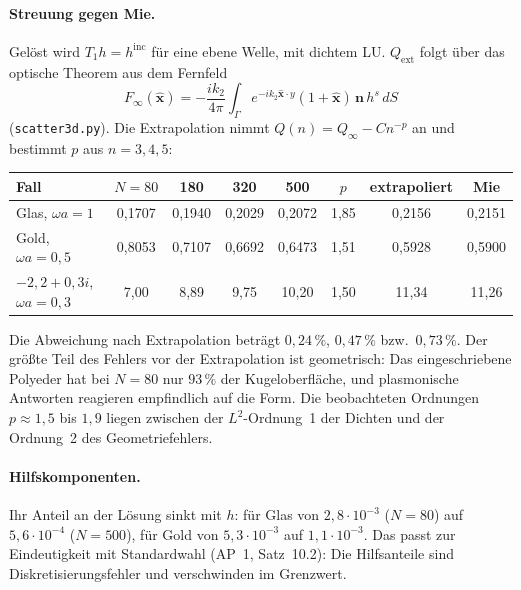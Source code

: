 \documentclass[11pt, a4paper]{article}
\newcommand{\mvec}[1]{\boldsymbol{#1}}
\newcommand{\n}{\mvec{n}}
\begin{document}
\paragraph{Streuung gegen Mie.} Gelöst wird $T_1h=h^{\mathrm{inc}}$ für eine ebene Welle,
mit dichtem LU. $Q_{\mathrm{ext}}$ folgt über das optische Theorem aus dem Fernfeld
\[
  F_\infty(\hat{\mvec x}) = -\frac{ik_2}{4\pi}\int_\Gamma e^{-ik_2\hat{\mvec x}\cdot y}(1+\hat{\mvec x})\,\n\,h^s\,dS
\]
(\texttt{scatter3d.py}). Die Extrapolation nimmt $Q(n)=Q_\infty-Cn^{-p}$ an und bestimmt
$p$ aus $n=3,4,5$:
\begin{center}\small
\begin{tabular}{lccccccc}
\toprule
Fall & $N=80$ & 180 & 320 & 500 & $p$ & extrapoliert & Mie\\
\midrule
Glas, $\omega a=1$ & 0,1707 & 0,1940 & 0,2029 & 0,2072 & 1,85 & 0,2156 & 0,2151\\
Gold, $\omega a=0{,}5$ & 0,8053 & 0,7107 & 0,6692 & 0,6473 & 1,51 & 0,5928 & 0,5900\\
$-2{,}2+0{,}3i$, $\omega a=0{,}3$ & 7,00 & 8,89 & 9,75 & 10,20 & 1,50 & 11,34 & 11,26\\
\bottomrule
\end{tabular}
\end{center}
Die Abweichung nach Extrapolation beträgt $0{,}24\,\%$, $0{,}47\,\%$ bzw.\ $0{,}73\,\%$. Der
größte Teil des Fehlers vor der Extrapolation ist geometrisch: Das eingeschriebene
Polyeder hat bei $N=80$ nur $93\,\%$ der Kugeloberfläche, und plasmonische Antworten
reagieren empfindlich auf die Form. Die beobachteten Ordnungen $p\approx1{,}5$ bis $1{,}9$
liegen zwischen der $L^2$-Ordnung~1 der Dichten und der Ordnung~2 des
Geometriefehlers.

\paragraph{Hilfskomponenten.} Ihr Anteil an der Lösung sinkt mit $h$: für Glas von
$2{,}8\cdot10^{-3}$ ($N=80$) auf $5{,}6\cdot10^{-4}$ ($N=500$), für Gold von $5{,}3\cdot10^{-3}$ auf
$1{,}1\cdot10^{-3}$. Das passt zur Eindeutigkeit mit Standardwahl (AP~1, Satz~10.2): Die
Hilfsanteile sind Diskretisierungsfehler und verschwinden im Grenzwert.
\end{document}
